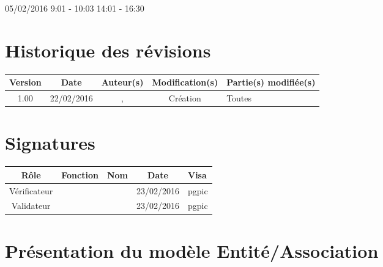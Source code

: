 \documentclass [a4paper] {article}
\begin{document}
05/02/2016			 				%
\hfill   
\hfill 	 9:01 - 10:03 	14:01 - 16:30			%


\section*{Historique des révisions}
\begin{center}
			\begin{tabular}{| c | c | c | c | p{4cm} |}
				\hline
				\rowcolor{Gray}
				Version & Date & Auteur(s) & Modification(s) & Partie(s) modifiée(s)		 \\
				\hline
				1.00 & 22/02/2016 & \Pierre, \Kafui & Création & Toutes \\
		\hline		
			\end{tabular}
		\end{center}

\section*{Signatures}

		\begin{center}
			\begin{tabular}{| c | c | c | c | p{4cm} |}
				\hline
				\rowcolor{Gray}
				Rôle & Fonction & Nom & Date & Visa		 \\
				\hline
				Vérificateur & \RGC & \Mathieu & 23/02/2016 & pgpic \\[30pt]
				\hline
				Validateur & \CP & \Sergi & 23/02/2016 & pgpic \\[30pt]	
				\hline
			\end{tabular}
		\end{center}


\section{Présentation du modèle Entité/Association}
\end{document}
